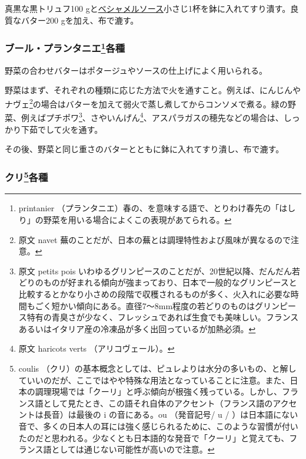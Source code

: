 \begin{recette}
真黒な黒トリュフ100
gと\protect\hyperlink{sauce-bechamel}{ベシャメルソース}小さじ1杯を鉢に入れてすり潰す。良質なバター200
gを加え、布で漉す。

\hypertarget{beurres-printaniers}{%
\subsubsection[ブール・プランタニエ各種]{\texorpdfstring{ブール・プランタニエ\footnote{printanier
  （プランタニエ）春の、を意味する語で、とりわけ春先の「はしり」の野菜を用いる場合によくこの表現があてられる。}各種}{ブール・プランタニエ各種}}\label{beurres-printaniers}}



野菜の合わせバターはポタージュやソースの仕上げによく用いられる。

野菜はまず、それぞれの種類に応じた方法で火を通すこと。例えば、にんじんやナヴェ\footnote{原文
  navet 蕪のことだが、日本の蕪とは調理特性および風味が異なるので注意。}の場合はバターを加えて弱火で蒸し煮してからコンソメで煮る。緑の野菜、例えばプチポワ\footnote{原文
  petits pois
  いわゆるグリンピースのことだが、20世紀以降、だんだん若どりのものが好まれる傾向が強まっており、日本で一般的なグリンピースと比較するとかなり小さめの段階で収穫されるものが多く、火入れに必要な時間もごく短かい傾向にある。直径7〜8mm程度の若どりのものはグリンピース特有の青臭さが少なく、フレッシュであれば生食でも美味しい。フランスあるいはイタリア産の冷凍品が多く出回っているが加熱必須。}、さやいんげん\footnote{原文
  haricots verts （アリコヴェール）。}、アスパラガスの穂先などの場合は、しっかり下茹でして火を通す。

その後、野菜と同じ重さのバターとともに鉢に入れてすり潰し、布で漉す。

\hypertarget{coulis-divers}{%
\subsubsection[クリ各種]{\texorpdfstring{クリ\footnote{coulis
  （クリ）の基本概念としては、ピュレよりは水分の多いもの、と解していいのだが、ここではやや特殊な用法となっていることに注意。また、日本の調理現場では「クーリ」と呼ぶ傾向が根強く残っている。しかし、フランス語として見たとき、この語それ自体のアクセント（フランス語のアクセントは長音）は最後の
  i の音にある。ou （発音記号/ u /
  ）は日本語にない音で、多くの日本人の耳には強く感じられるために、このような習慣が付いたのだと思われる。少なくとも日本語的な発音で「クーリ」と覚えても、フランス語としては通じない可能性が高いので注意。}各種}{クリ各種}}\label{coulis-divers}}


\end{recette}
